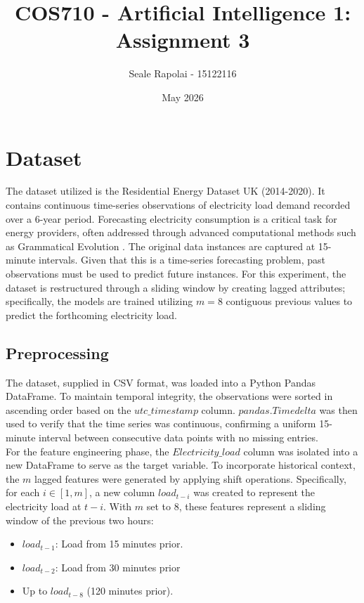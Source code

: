\documentclass[12pt]{article}
\title{COS710 - Artificial Intelligence 1: Assignment 3}
\author{Seale Rapolai - 15122116}
\date{May 2026}
\begin{document}
\maketitle

\section{Dataset} \label{sec:dataset}
    The dataset utilized is the Residential Energy Dataset UK (2014-2020). It contains continuous time-series observations of electricity load demand recorded over a 6-year period. Forecasting electricity consumption is a critical task for energy providers, often addressed through advanced computational methods such as Grammatical Evolution \cite{castelli2015}. The original data instances are captured at 15-minute intervals. Given that this is a time-series forecasting problem, past observations must be used to predict future instances. For this experiment, the dataset is restructured through a sliding window by creating lagged attributes; specifically, the models are trained utilizing $m=8$ contiguous previous values to predict the forthcoming electricity load.

    \subsection{Preprocessing}
    The dataset, supplied in CSV format, was loaded into a Python Pandas DataFrame. To maintain temporal integrity, the observations were sorted in ascending order based on the $utc\_timestamp$ column. $pandas.Timedelta$ was then used to verify that the time series was continuous, confirming a uniform 15-minute interval between consecutive data points with no missing entries.
    \\
    For the feature engineering phase, the $Electricity\_load$ column was isolated into a new DataFrame to serve as the target variable. To incorporate historical context, the $m$ lagged features were generated by applying shift operations. Specifically, for each $i \in [1, m]$, a new column $load_{t-i}$ was created to represent the electricity load at $t-i$. With $m$ set to 8, these features represent a sliding window of the previous two hours:
    \begin{itemize}
        \item $load_{t-1}$: Load from 15 minutes prior. 
        \item $load_{t-2}$: Load from 30 minutes prior
        \item Up to $load_{t-8}$ (120 minutes prior).
    \end{itemize}
\end{document}
